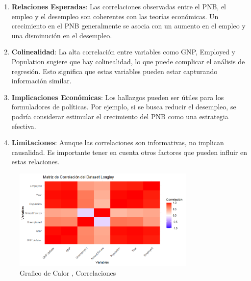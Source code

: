 \documentclass{article}
\begin{document}
\begin{enumerate}
    \item \textbf{Relaciones Esperadas}: Las correlaciones observadas entre el PNB, el empleo y el desempleo son coherentes con las teorías económicas. Un crecimiento en el PNB generalmente se asocia con un aumento en el empleo y una disminución en el desempleo.
    
    \item \textbf{Colinealidad}: La alta correlación entre variables como GNP, Employed y Population sugiere que hay colinealidad, lo que puede complicar el análisis de regresión. Esto significa que estas variables pueden estar capturando información similar.
    
    \item \textbf{Implicaciones Económicas}: Los hallazgos pueden ser útiles para los formuladores de políticas. Por ejemplo, si se busca reducir el desempleo, se podría considerar estimular el crecimiento del PNB como una estrategia efectiva.
    
    \item \textbf{Limitaciones}: Aunque las correlaciones son informativas, no implican causalidad. Es importante tener en cuenta otros factores que pueden influir en estas relaciones.
\end{enumerate}

\begin{figure}[h] %
    \centering %
    \includegraphics[width=0.8\textwidth]{Correlacion.png}
    \caption{Grafico de Calor , Correlaciones } %
    \label{fig:mi_imagen} %
\end{figure}
\end{document}
